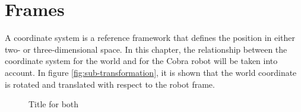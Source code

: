 \section{Frames}\label{ch:frames}
A coordinate system is a reference framework that defines the position in either two- or three-dimensional space. In this chapter, the relationship between the coordinate system for the world and for the Cobra robot will be taken into account. In figure \ref{fig:sub-transformation}, it is shown that the world coordinate is rotated and translated with respect to the robot frame. 

\begin{figure}[hb]
\hfill
{}
\hfill
{}
\hfill
\caption{Title for both}
\end{figure}

